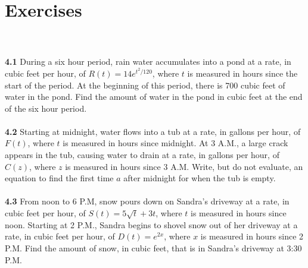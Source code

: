 \documentclass[11pt]{scrartcl}
\begin{document}
\section{Exercises}\\
\\
\noindent 
\textbf{4.1} During a six hour period, rain water accumulates into a pond at a rate, in cubic feet per hour, of $R(t)=14e^{t^2/120}$, where $t$ is measured in hours since the start of the period. At the beginning of this period, there is 700 cubic feet of water in the pond. Find the amount of water in the pond in cubic feet at the end of the six hour period. \\
\\
\noindent 
\textbf{4.2} Starting at midnight, water flows into a tub at a rate, in gallons per hour, of $F(t)$, where $t$ is measured in hours since midnight. At 3 A.M., a large crack appears in the tub, causing water to drain at a rate, in gallons per hour, of $C(z)$, where $z$ is measured in hours since 3 A.M. Write, but do not evaluate, an equation to find the first time $a$ after midnight for when the tub is empty. \\
\\
\noindent 
\textbf{4.3} From noon to 6 P.M, snow pours down on Sandra's driveway at a rate, in cubic feet per hour, of $S(t)=5\sqrt{t}+3t$, where $t$ is measured in hours since noon. Starting at 2 P.M., Sandra begins to shovel snow out of her driveway at a rate, in cubic feet per hour, of $D(t)=e^{2x}$, where $x$ is measured in hours since 2 P.M. Find the amount of snow, in cubic feet, that is in Sandra's driveway at 3:30 P.M.
\end{document}

